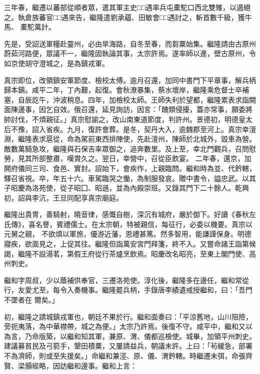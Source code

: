 \begin{pinyinscope}
 三年春，繼遷以蕃部從順者眾，遣其軍主史□□遇率兵屯橐駝口西北雙雉，以遏絕之。執倉族蕃官□□遇來告，繼隆遣劉承蘊、田敏會□□遇討之，斬首數千級，獲牛馬、
 橐駝萬計。



 先是，受詔送軍糧赴靈州，必由旱海路，自冬至春，而芻粟始集。繼隆請由古原州蔚茹河路便，眾議不一，繼隆固執論其事，太宗許焉。遂率師以進，壁古原州，令如京使胡守澄城之，是為鎮戎軍。



 真宗即位，改領鎮安軍節度、檢校太傅。逾月召還，加同中書門下平章事，解兵柄歸本鎮。咸平二年，丁內艱，起復。會秋潦暴集，蔡水壞岸，繼隆乘危督士卒補塞，自辰訖午，沖波稍息。四年，加檢校太師。王師失利於望都，繼隆累表求詣闕
 面陳邊事，因乞自效。俄召還，延見詢訪，因言：「醜類侵擾，蓋亦常事，願委將帥討伐，不煩親征。」真宗慰諭之，改山南東道節度，判許州。景德初，明德皇太后不豫，詔入省疾。九月，復許會葬。是冬，契丹大入，逾魏郡至河上。真宗幸澶淵，繼隆表求扈從，命為駕前東西排陣使，先赴澶州，陳師於北城外，毀車為營。敵數萬騎急攻，繼隆與石保吉率眾御之，追奔數里。及上至，幸北門觀兵，召問慰勞，見其所部整肅，嘆賞久之。翌日，幸營中，召從臣飲宴。
 二年春，還京，加開府儀同三司、食邑、實封。詔始下，會疾作，上親臨問。繼和時為並、代鈐轄，驛召省視。卒，年五十六。車駕臨哭之慟，為制服發哀。贈中書令，謚忠武。以其子昭慶為洛苑使，從子昭囗、昭遜，並為內殿崇班。又錄其門下二十餘人。乾興初，詔與李沆，王旦同配享真宗廟庭。



 繼隆出貴冑，善騎射，曉音律，感慨自樹，深沉有城府，嚴於御下。好讀《春秋左氏傳》，喜名譽，賓禮儒士。在太宗朝，特被親信，每征行，必委以機要。真宗以元舅之親，
 不欲煩以軍旅，優游近藩，恩禮甚篤。然多智用，能謙謹保身。明德寢疾，欲面見之，上促其往。繼隆但詣萬安宮門拜箋，終不入。又嘗命諸王詣第候謁，繼隆不設湯茗，第假王府從行茶爐烹飲焉。昭慶改名昭亮，至東上閣門使、高州刺史。



 繼和字周叔，少以蔭補供奉官，三遷洛苑使。淳化後，繼隆多在邊任，繼和常從行，友愛尤至，每令入奏機事。繼隆罷兵柄，手錄唐李績遺戒授繼和，曰：「吾門不墜者在
 爾矣。」



 初，繼隆之請城鎮戎軍也，朝廷不果於行。繼和面奏曰：「平涼舊地，山川阻險，旁扼夷落，為中華襟帶，城之為便。」太宗乃許焉。後復不守。咸平中，繼和又以為言，乃命版築，以繼和知其軍，兼原、渭、儀都巡檢使。城畢，加領平州刺史。建議募貧民及弓箭手，墾田積粟，又屢請益兵，朝議未許。上曰：「茍緩急，部署不為濟師，則或至失援矣。」命繼和兼涇、原、儀、渭鈐轄。時繼遷未弭，命張齊賢、梁顥經略，因訪繼和邊事。繼和上言：




\end{pinyinscope}
